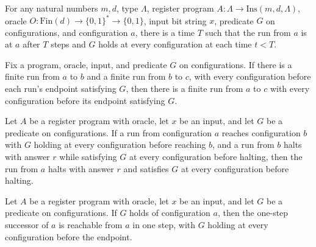 \begin{lemma}
\label{Complexity.LogProg.AReach.refl}
\leanok
{}
For any natural numbers $m,d$, type $\Lambda$, register program $A : \Lambda \to
\mathrm{Ins}(m,d,\Lambda)$, oracle $O : \mathrm{Fin}(d) \to \{0,1\}^* \to \{0,1\}$,
input bit string $x$, predicate $G$ on configurations, and configuration $a$, there is a
time $T$ such that the run from $a$ is at $a$ after $T$ steps and $G$ holds at every
configuration at each time $t<T$.
\end{lemma}

\begin{lemma}
\label{Complexity.LogProg.AReach.trans}
\leanok
{}
Fix a program, oracle, input, and predicate $G$ on configurations. If there is a finite
run from $a$ to $b$ and a finite run from $b$ to $c$, with every configuration before
each run's endpoint satisfying $G$, then there is a finite run from $a$ to $c$ with
every configuration before its endpoint satisfying $G$.
\end{lemma}

\begin{lemma}
\label{Complexity.LogProg.AReach.halt}
\leanok
{}
Let $A$ be a register program with oracle, let $x$ be an input, and let $G$ be a
predicate on configurations. If a run from configuration $a$ reaches configuration $b$
with $G$ holding at every configuration before reaching $b$, and a run from $b$ halts
with answer $r$ while satisfying $G$ at every configuration before halting, then the run
from $a$ halts with answer $r$ and satisfies $G$ at every configuration before halting.
\end{lemma}

\begin{lemma}
\label{Complexity.LogProg.AReach.single}
\leanok
{}
Let $A$ be a register program with oracle, let $x$ be an input, and let $G$ be a
predicate on configurations. If $G$ holds of configuration $a$, then the one-step
successor of $a$ is reachable from $a$ in one step, with $G$ holding at every
configuration before the endpoint.
\end{lemma}

